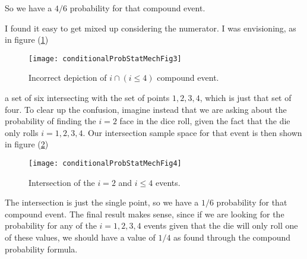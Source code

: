 So we have a $4/6$ probability for that compound event.

I found it easy to get mixed up considering the numerator.  I was envisioning, as in figure (\ref{fig:conditionalProbStatMech:conditionalProbStatMechFig3})
\begin{figure}[htp]
   \centering
   \texttt{[image: conditionalProbStatMechFig3]}
   \caption{Incorrect depiction of $i \cap (i \le 4)$ compound event.}\label{fig:conditionalProbStatMech:conditionalProbStatMechFig3}
\end{figure}

a set of six intersecting with the set of points $1,2,3,4$, which is just that set of four.  To clear up the confusion, imagine instead that we are asking about the probability of finding the $i = 2$ face in the dice roll, given the fact that the die only rolls $i = 1, 2, 3, 4$.  Our intersection sample space for that event is then shown in figure (\ref{fig:conditionalProbStatMech:conditionalProbStatMechFig4})
\begin{figure}[htp]
   \centering
   \texttt{[image: conditionalProbStatMechFig4]}
   \caption{Intersection of the $i = 2$ and $i \le 4$ events.}\label{fig:conditionalProbStatMech:conditionalProbStatMechFig4}
\end{figure}

The intersection is just the single point, so we have a $1/6$ probability for that compound event.  The final result makes sense, since if we are looking for the probability for any of the $i = 1, 2, 3, 4$ events given that the die will only roll one of these values, we should have a value of $1/4$ as found through the compound probability formula.

\EndArticle

